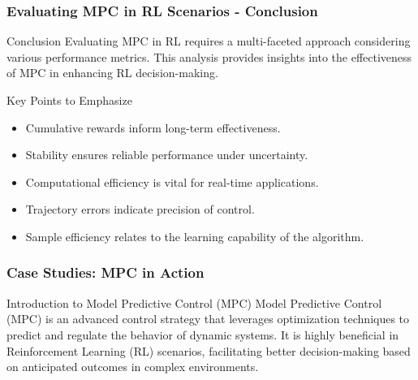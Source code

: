 \documentclass[aspectratio=169]{beamer}
\begin{document}
\begin{frame}[fragile]
    \frametitle{Evaluating MPC in RL Scenarios - Conclusion}
    \begin{block}{Conclusion}
        Evaluating MPC in RL requires a multi-faceted approach considering various performance metrics. This analysis provides insights into the effectiveness of MPC in enhancing RL decision-making.
    \end{block}
    \begin{block}{Key Points to Emphasize}
        \begin{itemize}
            \item Cumulative rewards inform long-term effectiveness.
            \item Stability ensures reliable performance under uncertainty.
            \item Computational efficiency is vital for real-time applications.
            \item Trajectory errors indicate precision of control.
            \item Sample efficiency relates to the learning capability of the algorithm.
        \end{itemize}
    \end{block}
\end{frame}

\begin{frame}[fragile]
    \frametitle{Case Studies: MPC in Action}
    \begin{block}{Introduction to Model Predictive Control (MPC)}
        Model Predictive Control (MPC) is an advanced control strategy that leverages optimization techniques to predict and regulate the behavior of dynamic systems. It is highly beneficial in Reinforcement Learning (RL) scenarios, facilitating better decision-making based on anticipated outcomes in complex environments.
    \end{block}
\end{frame}
\end{document}
